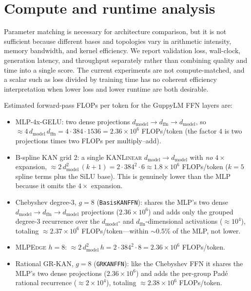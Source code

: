 \documentclass[11pt]{article}
\newcommand{\modelname}[1]{\textsc{#1}}
\newcommand{\grkan}{\modelname{GR-KAN}}
\newcommand{\mlpedge}{\modelname{MLPEdge}}
\newcommand{\kanlinear}{\modelname{KANLinear}}
\begin{document}
\section{Compute and runtime analysis}
\label{app:compute}

Parameter matching is necessary for architecture comparison, but it is not sufficient because different bases and topologies vary in arithmetic intensity, memory bandwidth, and kernel efficiency. We report validation loss, wall-clock, generation latency, and throughput separately rather than combining quality and time into a single score. The current experiments are not compute-matched, and a scalar such as loss divided by training time has no coherent efficiency interpretation when lower loss and lower runtime are both desirable.

Estimated forward-pass FLOPs per token for the GuppyLM FFN layers are:
\begin{itemize}
\item MLP-4x-GELU: two dense projections \(d_{\mathrm{model}}\!\to\!d_{\mathrm{ffn}}\!\to\!d_{\mathrm{model}}\), so \(\approx 4\,d_{\mathrm{model}}\,d_{\mathrm{ffn}} = 4\cdot384\cdot1536 = 2.36\times10^6\) FLOPs/token (the factor \(4\) is two projections times two FLOPs per multiply--add).
\item B-spline KAN grid 2: a single \kanlinear{} \(d_{\mathrm{model}}\!\to\!d_{\mathrm{model}}\) with \emph{no} \(4\times\) expansion, \(\approx 2\,d_{\mathrm{model}}^2\,(k+1) = 2\cdot384^2\cdot6 \approx 1.8\times10^6\) FLOPs/token (\(k=5\) spline terms plus the SiLU base). This is genuinely lower than the MLP because it omits the \(4\times\) expansion.
\item Chebyshev degree-3, \(g=8\) (\texttt{BasisKANFFN}): shares the MLP's two dense \(d_{\mathrm{model}}\!\to\!d_{\mathrm{ffn}}\!\to\!d_{\mathrm{model}}\) projections (\(2.36\times10^6\)) and adds only the grouped degree-3 recurrence over the \(d_{\mathrm{model}}\)- and \(d_{\mathrm{ffn}}\)-dimensional activations (\(\approx 10^4\)), totaling \(\approx 2.37\times10^6\) FLOPs/token---within \(\sim\)0.5\% of the MLP, not lower.
\item \mlpedge{} \(h=8\): \(\approx 2\,d_{\mathrm{model}}^2\,h = 2\cdot384^2\cdot8 = 2.36\times10^6\) FLOPs/token.
\item Rational \grkan{}, \(g=8\) (\texttt{GRKANFFN}): like the Chebyshev FFN it shares the MLP's two dense projections (\(2.36\times10^6\)) and adds the per-group Pad\'{e} rational recurrence (\(\approx 2\times10^4\)), totaling \(\approx 2.38\times10^6\) FLOPs/token.
\end{itemize}
\end{document}
